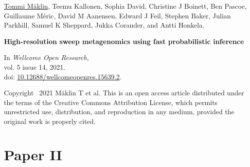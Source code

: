 \vspace{80pt}
\underline{Tommi Mäklin}, Teemu Kallonen, Sophia David, Christine J
Boinett, Ben Pascoe, Guillaume Méric, David M Aanensen, Edward J Feil,
Stephen Baker, Julian Parkhill, Samuel K Sheppard, Jukka Corander, and
Antti Honkela.

\vspace{10pt}
\noindent\textbf{High-resolution sweep metagenomics using fast probabilistic inference}

\vspace{10pt}
\noindent In
\emph{Wellcome Open Research},
\\vol. 5 issue 14, 2021.
\\doi: \href{https://doi.org/10.12688/wellcomeopenres.15639.2}{10.12688/wellcomeopenres.15639.2}.

\vspace{60pt}
\noindent Copyright \textcopyright\ 2021 Mäklin T et al. This is an
open access article distributed under the terms of the Creative
Commons Attribution License, which permits unrestricted use,
distribution, and reproduction in any medium, provided the original
work is properly cited.

\cleardoublepage





\chapter*{Paper II}\thispagestyle{plain}







